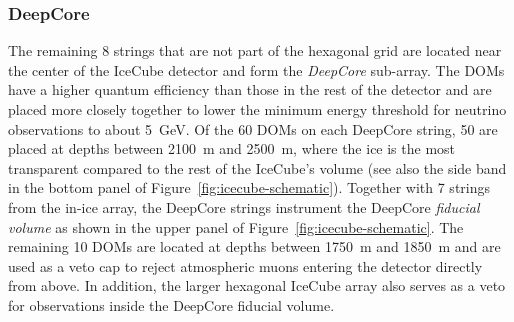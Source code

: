 \subsubsection{DeepCore}
The remaining 8 strings that are not part of the hexagonal grid are located near the center of the IceCube detector and form the \emph{DeepCore} sub-array.
The DOMs have a higher quantum efficiency than those in the rest of the detector and are placed more closely together to lower the minimum energy threshold for neutrino observations to about 5~GeV. Of the 60 DOMs on each DeepCore string, 50 are placed at depths between 2100~m and 2500~m, where the ice is the most transparent compared to the rest of the IceCube's volume (see also the side band in the bottom panel of Figure~\ref{fig:icecube-schematic}). Together with 7 strings from the in-ice array, the DeepCore strings instrument the DeepCore \emph{fiducial volume} as shown in the upper panel of Figure~\ref{fig:icecube-schematic}.
The remaining 10 DOMs are located at depths between 1750~m and 1850~m and are used as a veto cap to reject atmospheric muons entering the detector directly from above. In addition, the larger hexagonal IceCube array also serves as a veto for observations inside the DeepCore fiducial volume.
